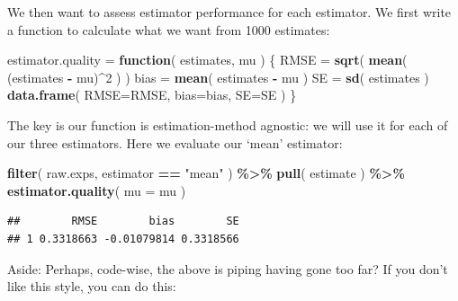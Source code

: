 \documentclass[
]{book}
\newenvironment{Shaded}{\begin{snugshade}}{\end{snugshade}}
\newcommand{\AttributeTok}[1]{\textcolor[rgb]{0.13,0.29,0.53}{#1}}
\newcommand{\ControlFlowTok}[1]{\textcolor[rgb]{0.13,0.29,0.53}{\textbf{#1}}}
\newcommand{\DecValTok}[1]{\textcolor[rgb]{0.00,0.00,0.81}{#1}}
\newcommand{\FunctionTok}[1]{\textcolor[rgb]{0.13,0.29,0.53}{\textbf{#1}}}
\newcommand{\NormalTok}[1]{#1}
\newcommand{\OtherTok}[1]{\textcolor[rgb]{0.56,0.35,0.01}{#1}}
\newcommand{\SpecialCharTok}[1]{\textcolor[rgb]{0.81,0.36,0.00}{\textbf{#1}}}
\newcommand{\StringTok}[1]{\textcolor[rgb]{0.31,0.60,0.02}{#1}}
\begin{document}
We then want to assess estimator performance for each estimator.
We first write a function to calculate what we want from 1000 estimates:

\begin{Shaded}
\begin{Highlighting}[]
\NormalTok{estimator.quality }\OtherTok{=} \ControlFlowTok{function}\NormalTok{( estimates, mu ) \{}
\NormalTok{    RMSE }\OtherTok{=} \FunctionTok{sqrt}\NormalTok{( }\FunctionTok{mean}\NormalTok{( (estimates }\SpecialCharTok{{-}}\NormalTok{ mu)}\SpecialCharTok{\^{}}\DecValTok{2}\NormalTok{ ) )}
\NormalTok{    bias }\OtherTok{=} \FunctionTok{mean}\NormalTok{( estimates }\SpecialCharTok{{-}}\NormalTok{ mu )}
\NormalTok{    SE }\OtherTok{=} \FunctionTok{sd}\NormalTok{( estimates )}
    \FunctionTok{data.frame}\NormalTok{( }\AttributeTok{RMSE=}\NormalTok{RMSE, }\AttributeTok{bias=}\NormalTok{bias, }\AttributeTok{SE=}\NormalTok{SE )}
\NormalTok{\}}
\end{Highlighting}
\end{Shaded}

The key is our function is estimation-method agnostic: we will use it for each of our three estimators.
Here we evaluate our `mean' estimator:

\begin{Shaded}
\begin{Highlighting}[]
\FunctionTok{filter}\NormalTok{( raw.exps, estimator }\SpecialCharTok{==} \StringTok{"mean"}\NormalTok{ ) }\SpecialCharTok{\%\textgreater{}\%}
    \FunctionTok{pull}\NormalTok{( estimate ) }\SpecialCharTok{\%\textgreater{}\%}
    \FunctionTok{estimator.quality}\NormalTok{( }\AttributeTok{mu =}\NormalTok{ mu )}
\end{Highlighting}
\end{Shaded}

\begin{verbatim}
##        RMSE        bias        SE
## 1 0.3318663 -0.01079814 0.3318566
\end{verbatim}

Aside: Perhaps, code-wise, the above is piping having gone too far? If you don't like this style, you can do
this:

\begin{Shaded}
\end{Shaded}
\end{document}

